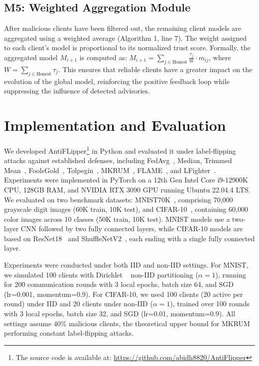 \documentclass[conference]{IEEEtran}
\begin{document}
 \subsection{M5: Weighted Aggregation Module}
After malicious clients have been filtered out, the remaining client models are aggregated using a weighted average (Algorithm 1, line 7). The weight assigned to each client's model is proportional to its normalized trust score. Formally, the aggregated model $M_{i+1}$ is computed as: \(
M_{i+1} = \sum_{j \in \text{Honest}} \frac{\tau_j}{W} \cdot m_{ij} \), where $W = \sum_{j \in \text{Honest}} \tau_j$. This ensures that reliable clients have a greater impact on the evolution of the global model, reinforcing the positive feedback loop while suppressing the influence of detected advisories.

\section{Implementation and Evaluation}
\label{sec:implement&eval}

We developed AntiFLipper\footnote{The source code is available at: \url{https://github.com/abidh8820/AntiFlipper}} in Python and evaluated it under label-flipping attacks against established defenses, including FedAvg~\cite{fedavg-pmlr-v54-mcmahan17a}, Median, Trimmed Mean~\cite{yin2018byzantine}, FoolsGold~\cite{fung2020limitations}, Tolpegin~\cite{tolpegin2020data}, MKRUM~\cite{NIPS2017_f4b9ec30}, FLAME~\cite{nguyen2022flame}, and LFighter~\cite{jebreel2024lfighter}. Experiments were implemented in PyTorch on a 12th Gen Intel Core i9-12900K CPU, 128GB RAM, and NVIDIA RTX 3090 GPU running Ubuntu 22.04.4 LTS. We evaluated on two benchmark datasets: MNIST70K~\cite{MNIST-lecun1998gradient}, comprising 70,000 grayscale digit images (60K train, 10K test), and CIFAR-10~\cite{CIFAR-krizhevsky2009learning}, containing 60,000 color images across 10 classes (50K train, 10K test). MNIST models use a two-layer CNN followed by two fully connected layers, while CIFAR-10 models are based on ResNet18~\cite{resnet-he2016deep} and ShuffleNetV2~\cite{shufflenetV2-ma2018shufflenet}, each ending with a single fully connected layer.

Experiments were conducted under both IID and non-IID settings. For MNIST, we simulated 100 clients with Dirichlet ~\cite{ferguson1973bayesian} non-IID partitioning ($\alpha=1$), running for 200 communication rounds with 3 local epochs, batch size 64, and SGD (lr=0.001, momentum=0.9). For CIFAR-10, we used 100 clients (20 active per round) under IID and 20 clients under non-IID ($\alpha=1$), trained over 100 rounds with 3 local epochs, batch size 32, and SGD (lr=0.01, momentum=0.9). All settings assume 40\% malicious clients, the theoretical upper bound for MKRUM~\cite{NIPS2017_f4b9ec30} performing constant label-flipping attacks.
\end{document}
